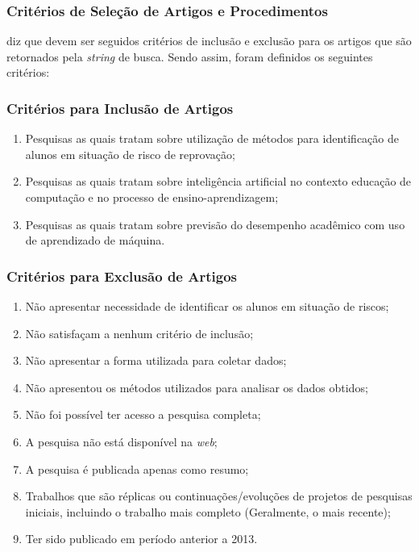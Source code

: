 \documentclass[
	12pt,				%
	openright,			%
	oneside,
	a4paper,			%
	english,			%
	french,				%
	spanish,			%
	brazil,				%
	]{abntex2}
\begin{document}
\subsubsection{Critérios de Seleção de Artigos e Procedimentos}
 diz que devem ser seguidos critérios de inclusão e exclusão para os artigos que são retornados pela \textit{string} de busca. Sendo assim, foram definidos os seguintes critérios:

\subsubsection{Critérios para Inclusão de Artigos}

\begin{enumerate}
    \item Pesquisas as quais tratam sobre utilização de métodos para identificação de alunos em situação de risco de reprovação;
    \item Pesquisas as quais tratam sobre inteligência artificial no contexto educação de computação e no processo de ensino-aprendizagem;
    \item Pesquisas as quais tratam sobre previsão do desempenho acadêmico com uso de aprendizado de máquina.
\end{enumerate}

\subsubsection{Critérios para Exclusão de Artigos}
\begin{enumerate}
    \item Não apresentar necessidade de identificar os alunos em situação de riscos;
    \item Não satisfaçam a nenhum critério de inclusão;
    \item Não apresentar a forma utilizada para coletar dados;
    \item Não apresentou os métodos utilizados para analisar os dados obtidos;
    \item Não foi possível ter acesso a pesquisa completa;
    \item A pesquisa não está disponível na \textit{web};
    \item A pesquisa é publicada apenas como resumo;
    \item Trabalhos que são réplicas ou continuações/evoluções de projetos de pesquisas iniciais, incluindo o trabalho mais completo (Geralmente, o mais recente);
    \item Ter sido publicado em período anterior a 2013.
\end{enumerate}
\end{document}

